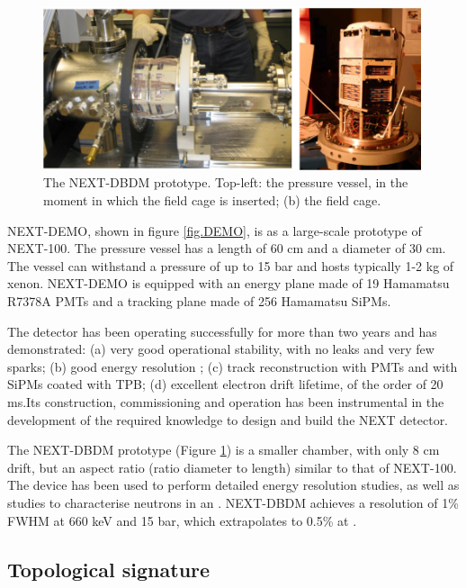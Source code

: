 \begin{figure}
\centering
\includegraphics[width=0.99\textwidth]{img/DBDM.png}
\caption{\small The NEXT-DBDM prototype. Top-left: the pressure vessel, in the moment in which the field cage is inserted; (b) the field cage.} \label{fig.DBDM}
\end{figure}


NEXT-DEMO, shown in figure \ref{fig.DEMO}, is as a large-scale prototype of NEXT-100. The pressure vessel has a length of 60 cm and a diameter of 30 cm. The vessel can withstand a pressure of up to 15 bar and hosts typically 1-2 kg of xenon. NEXT-DEMO is  equipped with an energy plane made of 19 Hamamatsu R7378A PMTs and a tracking plane made of 256 Hamamatsu SiPMs. 

The detector has been operating successfully for more than two years and has demonstrated: (a) very good operational stability, with no leaks and very few sparks; (b) good energy resolution ; (c) track reconstruction with PMTs and with SiPMs coated with TPB; (d) excellent electron drift lifetime, of the order of 20 ms.Its construction, commissioning and operation has been instrumental in the development of the required knowledge to design and build the NEXT detector.

The NEXT-DBDM prototype (Figure \ref{fig.DBDM}) is a smaller chamber, with only 8 cm drift, but an aspect ratio (ratio diameter to length) similar to that of NEXT-100. The device has been used to perform detailed energy resolution studies, as well as studies to characterise neutrons in an \HPXE. NEXT-DBDM achieves a resolution of 1\% FWHM at 660 keV and 15 bar, which extrapolates to 0.5\% at \Qbb.

\subsection{Topological signature}

